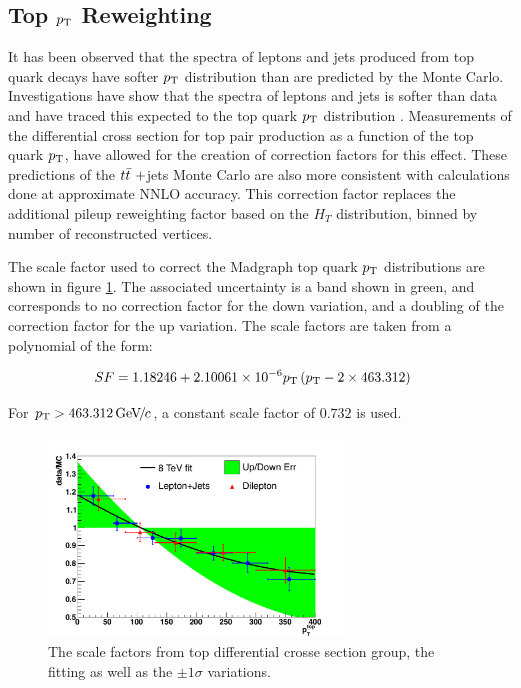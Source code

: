 \subsection{Top $p_{\mathrm{T}}$ Reweighting}
\label{top_pt_reweighting_overview}

\par It has been observed that the spectra of leptons and jets
produced from top quark decays have softer $p_{\mathrm{T}}$ distribution than are
predicted by the Monte Carlo.  Investigations have show that the \PT
spectra of leptons and jets is softer than data and have traced this
expected to the top quark $p_{\mathrm{T}}$ distribution
\cite{CMS-PAS-TOP-12-028, CMS-PAS-TOP-12-027}.  Measurements of the
differential cross section for top pair production as a function of
the top quark $p_{\mathrm{T}}$, have allowed for the creation of correction
factors for this effect.  These predictions of the $t{\bar{t}}~+$jets Monte
Carlo are also more consistent with calculations done at approximate
NNLO accuracy.  This correction factor replaces the additional pileup
reweighting factor based on the $H_{T}$ distribution, binned by number
of reconstructed vertices.  

\par The scale factor used to correct the Madgraph top quark $p_{\mathrm{T}}$
distributions are shown in figure \ref{fig:topptsys}.  The associated
uncertainty is a band shown in green, and corresponds to no correction
factor for the down variation, and a doubling of the correction factor
for the up variation.  The scale factors are taken from a polynomial
of the form:

\begin{align*}
SF &= 1.18246 + 2.10061\times 10^{-6} p_{\mathrm{T}} \left(p_{\mathrm{T}} - 2 \times 463.312 \right)
\end{align*}

\noindent For $p_{\mathrm{T}} > 463.312 {\,\text{Ge\hspace{-.08em}V\hspace{-0.16em}/\hspace{-0.08em}}c}$, a constant scale factor of $0.732$ is used.


\begin{figure}[hbtp]
 \begin{center}
   \includegraphics[width=0.7\textwidth]{Figures/Analysis_2_Diagrams/topptsys.pdf}
   \caption{The scale factors from top differential crosse section
     group, the fitting as well as the $\pm1\sigma$
     variations.}
   \label{fig:topptsys}
   \end{center}
\end{figure}


